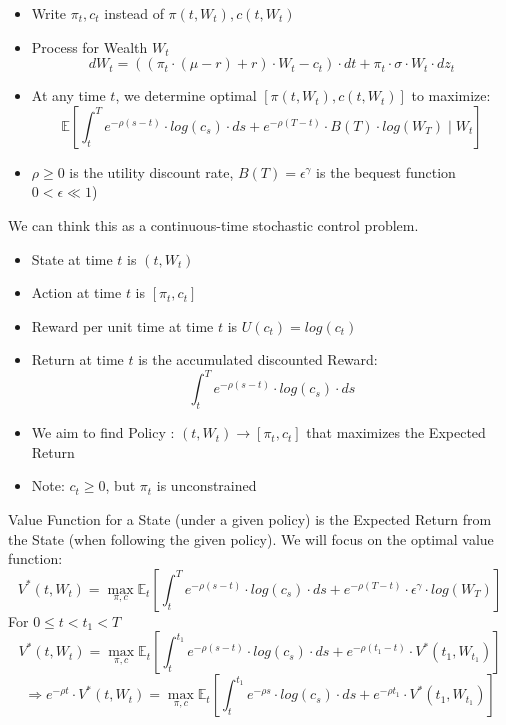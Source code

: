 \documentclass{article}
\begin{document}
\begin{itemize}
\item Write $\pi_{t}, c_{t}$ instead of $\pi\left(t, W_{t}\right), c\left(t, W_{t}\right)$
\item Process for Wealth $W_{t}$
$$
d W_{t}=\left(\left(\pi_{t} \cdot(\mu-r)+r\right) \cdot W_{t}-c_{t}\right) \cdot d t+\pi_{t} \cdot \sigma \cdot W_{t} \cdot d z_{t}
$$
\item At any time $t$, we determine optimal $\left[\pi\left(t, W_{t}\right), c\left(t, W_{t}\right)\right]$ to maximize:
$$
\mathbb{E}\left[\int_{t}^{T} e^{-\rho(s-t)}\cdot log(c_{s}) \cdot d s+e^{-\rho(T-t)} \cdot B(T) \cdot log(W_{T}) \mid W_{t}\right]
$$
\item $\rho \geq 0$ is the utility discount rate, $B(T)=\epsilon^{\gamma}$ is the bequest function  $0<\epsilon \ll 1$)
\end{itemize}
We can think this as a continuous-time stochastic control problem.
\begin{itemize}
\item State at time $t$ is $\left(t, W_{t}\right)$
\item Action at time $t$ is $\left[\pi_{t}, c_{t}\right]$
\item Reward per unit time at time $t$ is $U\left(c_{t}\right)=log(c_t)$
\item Return at time $t$ is the accumulated discounted Reward:
$$
\int_{t}^{T} e^{-\rho(s-t)} \cdot log (c_s)\cdot d s
$$
\item We aim to find Policy : $\left(t, W_{t}\right) \rightarrow\left[\pi_{t}, c_{t}\right]$ that maximizes the Expected Return
\item Note: $c_{t} \geq 0$, but $\pi_{t}$ is unconstrained
\end{itemize}
Value Function for a State (under a given policy) is the Expected Return from the State (when following the given policy). We will focus on the optimal value function:
$$V^{*}\left(t, W_{t}\right)=\max _{\pi, c} \mathbb{E}_{t}\left[\int_{t}^{T} e^{-\rho(s-t)} \cdot log(c_{s}) \cdot d s+e^{-\rho(T-t)} \cdot \epsilon^{\gamma} \cdot log(W_{T})\right]$$
For $0 \leq t<t_{1}<T$
$$V^{*}\left(t, W_{t}\right)=\max _{\pi, c} \mathbb{E}_{t}\left[\int_{t}^{t_{1}} e^{-\rho(s-t)} \cdot log(c_{s}) \cdot d s+e^{-\rho\left(t_{1}-t\right)} \cdot V^{*}\left(t_{1}, W_{t_{1}}\right)\right]$$
$$
\Rightarrow e^{-\rho t} \cdot V^{*}\left(t, W_{t}\right)=\max _{\pi, c} \mathbb{E}_{t}\left[\int_{t}^{t_{1}} e^{-\rho s} \cdot log(c_{s})\cdot d s+e^{-\rho t_{1}} \cdot V^{*}\left(t_{1}, W_{t_{1}}\right)\right]
$$
\end{document}
